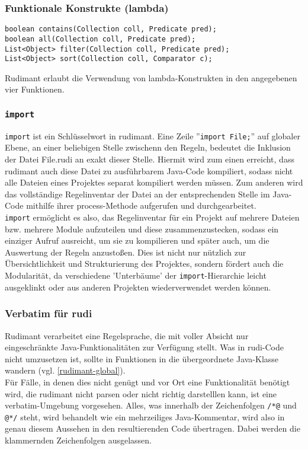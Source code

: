 \subsubsection{Funktionale Konstrukte (lambda)}

\begin{small}
\begin{verbatim}
boolean contains(Collection coll, Predicate pred);
boolean all(Collection coll, Predicate pred);
List<Object> filter(Collection coll, Predicate pred);
List<Object> sort(Collection coll, Comparator c);
\end{verbatim}
\end{small}

Rudimant erlaubt die Verwendung von lambda-Konstrukten in den angegebenen vier Funktionen.

\subsubsection{\texttt{import}}

\texttt{import} ist ein Schlüsselwort in rudimant. Eine Zeile ''\texttt{import File;}'' auf globaler Ebene, an einer  beliebigen Stelle zwischenn den Regeln, bedeutet die Inklusion der Datei File.rudi an exakt dieser Stelle. Hiermit wird zum einen erreicht, dass rudimant auch diese Datei zu ausführbarem Java-Code kompiliert, sodass nicht alle Dateien eines Projektes separat kompiliert werden müssen. Zum anderen wird das vollständige Regelinventar der Datei an der entsprechenden Stelle im Java-Code mithilfe ihrer process-Methode aufgerufen und durchgearbeitet.\\
\texttt{import} ermöglicht es also, das Regelinventar für ein Projekt auf mehrere Dateien bzw. mehrere Module aufzuteilen und diese zusammenzustecken, sodass ein einziger Aufruf ausreicht, um sie zu kompilieren und später auch, um die Auswertung der Regeln anzustoßen. Dies ist nicht nur nützlich zur Übersichtlichkeit und Strukturierung des Projektes, sondern fördert auch die Modularität, da verschiedene 'Unterbäume' der \texttt{import}-Hierarchie leicht ausgeklinkt oder aus anderen Projekten wiederverwendet werden können.

\subsubsection{Verbatim für rudi} \label{rudi-verbatim}

Rudimant verarbeitet eine Regelsprache, die mit voller Absicht nur eingeschränkte Java-Funktionalitäten zur Verfügung stellt. Was in rudi-Code nicht umzusetzen ist, sollte in Funktionen in die übergeordnete Java-Klasse wandern (vgl. \ref{rudimant-global}).\\
Für Fälle, in denen dies nicht genügt und vor Ort eine Funktionalität benötigt wird, die rudimant nicht parsen oder nicht richtig darstelllen kann, ist eine verbatim-Umgebung vorgesehen. Alles, was innerhalb der Zeichenfolgen \verb|/*@| und \verb|@*/| steht, wird behandelt wie ein mehrzeiliges Java-Kommentar, wird also in genau diesem Aussehen in den resultierenden Code übertragen. Dabei werden die klammernden Zeichenfolgen ausgelassen.

